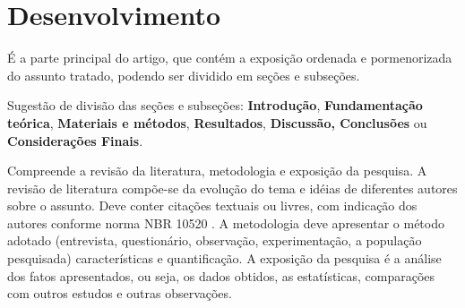 \section{Desenvolvimento}

É a parte principal do artigo, que contém a exposição ordenada e pormenorizada do assunto tratado, podendo ser dividido em seções e subseções.

Sugestão de divisão das seções e subseções: \textbf{Introdução}, \textbf{Fundamentação teórica}, \textbf{Materiais e métodos}, \textbf{Resultados}, \textbf{Discussão, Conclusões} ou \textbf{Considerações Finais}.

Compreende a revisão da literatura, metodologia e exposição da pesquisa. A revisão de literatura compõe-se da evolução do tema e idéias de diferentes autores sobre o assunto. Deve conter citações textuais ou livres, com indicação dos autores conforme norma NBR 10520 \cite{NBR10520:2002}. 
A metodologia deve apresentar o método adotado (entrevista, questionário, observação, experimentação, a população pesquisada) características e quantificação. 
A exposição da pesquisa é a análise dos fatos apresentados, ou seja, os dados obtidos, as estatísticas, comparações com outros estudos e outras observações. 